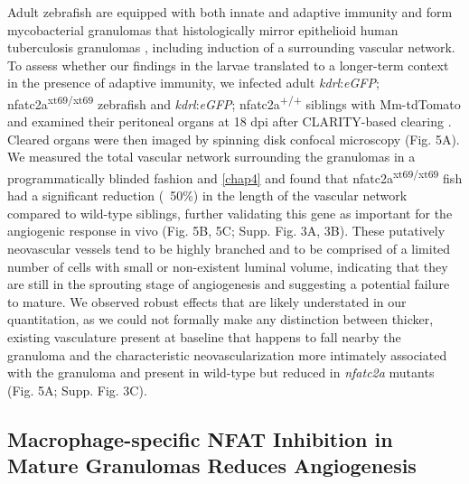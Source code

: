 Adult zebrafish are equipped with both innate and adaptive immunity and form mycobacterial granulomas that histologically mirror epithelioid human tuberculosis granulomas \citep{Swaim2006}, including induction of a surrounding vascular network. To assess whether our findings in the larvae translated to a longer-term context in the presence of adaptive immunity, we infected adult \textit{kdrl}:\textit{eGFP}; nfatc2a\textsuperscript{xt69/xt69} zebrafish and \textit{kdrl}:\textit{eGFP}; nfatc2a\textsuperscript{+/+} siblings with Mm-tdTomato and examined their peritoneal organs at 18 dpi after CLARITY-based clearing \citep{Chung2013, Cronan2015}. Cleared organs were then imaged by spinning disk confocal microscopy (Fig. 5A). We measured the total vascular network surrounding the granulomas in a programmatically blinded fashion \citep{Salter2016} and \autoref{chap4} and found that nfatc2a\textsuperscript{xt69/xt69} fish had a significant reduction (~50\%) in the length of the vascular network compared to wild-type siblings, further validating this gene as important for the angiogenic response in vivo (Fig. 5B, 5C; Supp. Fig. 3A, 3B). These putatively neovascular vessels tend to be highly branched and to be comprised of a limited number of cells with small or non-existent luminal volume, indicating that they are still in the sprouting stage of angiogenesis and suggesting a potential failure to mature. We observed robust effects that are likely understated in our quantitation, as we could not formally make any distinction between thicker, existing vasculature present at baseline that happens to fall nearby the granuloma and the characteristic neovascularization more intimately associated with the granuloma and present in wild-type but reduced in \textit{nfatc2a} mutants (Fig. 5A; Supp. Fig. 3C).

\subsection{\mbox{Macrophage-specific} NFAT Inhibition in Mature Granulomas Reduces Angiogenesis}

